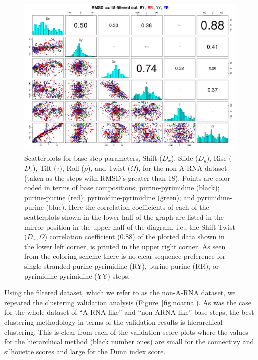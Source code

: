 \begin{figure}
\centering
\includegraphics[angle=90, scale=0.46]{Chapter2/noarna_step.png}
\caption{Scatterplots for base-step parameters, Shift ($D_{x}$), Slide
  ($D_{y}$), Rise  ($D_{z}$), Tilt ($\tau$), Roll  ($\rho$), and Twist
  ($\Omega$),  for the  non-A-RNA  dataset (taken  as  the steps  with
  RMSD's greater  than 18).  Points  are color-coded in terms  of base
  compositions;   purine-pyrimidine   (black);  purine-purine   (red);
  pyrimidine-pyrimidine  (green); and  pyrimidine-purine  (blue). Here
  the correlation  coefficients of each  of the scatterplots  shown in
  the lower half of the graph are listed in the mirror position in the
  upper half  of the diagram, i.e., the  Shift-Twist ($D_{x}, \Omega$)
  correlation  coefficient (0.88)  of the  plotted data  shown  in the
  lower left  corner, is printed in  the upper right  corner.  As seen
  from the coloring  scheme there is no clear  sequence preference for
  single-stranded  purine-pyrimidine   (RY),  purine-purine  (RR),  or
  pyrimidine-pyrimidine (YY) steps.}
\label{fig:pairsnoarna}
\end{figure}

Using  the  filtered dataset,  which  we  refer  to as  the  non-A-RNA
dataset,    we   repeated    the   clustering    validation   analysis
(Figure~\ref{fig:noarna}).  As  was the case for the  whole dataset of
``A-RNA like''  and ``non-ARNA-like'' base-steps,  the best clustering
methodology  in  terms  of  the  validation  results  is  hierarchical
clustering.  This is  clear from  each of  the validation  score plots
where the values  for the hierarchical method (black  number ones) are
small for the connectivy and  silhouette scores and large for the Dunn
index score.

